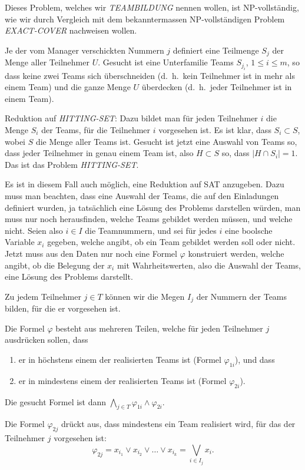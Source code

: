 \begin{loesung}
Dieses Problem, welches wir \textsl{TEAMBILDUNG} nennen wollen,
ist NP-vollständig, wie wir durch Vergleich mit dem bekanntermassen
NP-vollständigen Problem \textsl{EXACT-COVER} nachweisen wollen.

Je der vom Manager verschickten Nummern $j$ definiert eine Teilmenge
$S_j$ der Menge aller Teilnehmer $U$. Gesucht ist eine Unterfamilie
Teams $S_{j_i}$, $1\le i\le m$, so dass keine zwei Teams sich überschneiden
(d.~h.~kein Teilnehmer ist in mehr als einem Team) und die ganze Menge $U$
überdecken (d.~h.~jeder Teilnehmer ist in einem Team).

\medskip
Reduktion auf \textsl{HITTING-SET}: Dazu bildet man für jeden
Teilnehmer $i$ die Menge $S_i$ der Teams, für die Teilnehmer $i$
vorgesehen ist. Es ist klar, dass $S_i\subset S$, wobei $S$ die Menge
aller Teams ist. Gesucht ist jetzt eine Auswahl von Teams so, dass
jeder Teilnehmer in genau einem Team ist, also $H\subset S$ so,
dass $|H\cap S_i|=1$. Das ist das Problem \textsl{HITTING-SET}.

\medskip
Es ist in diesem Fall auch möglich, eine Reduktion auf SAT anzugeben.
Dazu muss man beachten, dass eine Auswahl der Teams, die auf den
Einladungen definiert wurden, ja tatsächlich eine Lösung des
Problems darstellen würden, man muss nur noch herausfinden, welche
Teams gebildet werden müssen, und welche nicht. Seien also $i\in I$
die Teamnummern, und sei für jedes $i$ eine boolsche Variable $x_i$
gegeben, welche angibt, ob ein Team gebildet werden soll oder nicht.
Jetzt muss aus den Daten nur noch eine Formel $\varphi$ konstruiert werden,
welche angibt, ob die Belegung der $x_i$ mit Wahrheitswerten, also die Auswahl
der Teams, eine Lösung des Problems darstellt.

Zu jedem Teilnehmer $j\in T$ können wir die Megen $I_j$ der Nummern
der Teams bilden, für die er vorgesehen ist.

Die Formel $\varphi$ besteht aus mehreren Teilen, welche für jeden
Teilnehmer $j$ ausdrücken sollen, dass 
\begin{enumerate}
\item er in höchstens einem der realisierten Teams ist (Formel $\varphi_{1i}$),
und dass
\item er in mindestens einem der realisierten Teams ist (Formel $\varphi_{2i}$).
\end{enumerate}
Die gesucht Formel ist dann
$\bigwedge_{j\in T} \varphi_{1i}\wedge \varphi_{2i}$.

Die Formel $\varphi_{2j}$ drückt aus, dass mindestens ein Team realisiert
wird, für das der Teilnehmer $j$ vorgesehen ist:
\begin{equation}
\varphi_{2j}=x_{i_1}\vee x_{i_2}\vee\dots\vee x_{i_k} = \bigvee_{i\in I_j}x_i.
\label{70000025:1}
\end{equation}


\end{loesung}
